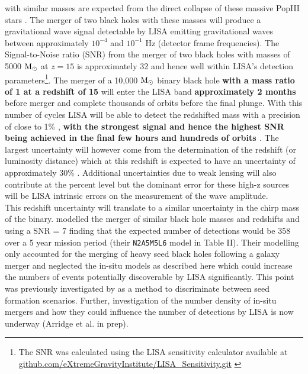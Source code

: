 \documentclass[twocolumn,iop,revtex4]{openjournal}
\newcommand{\msolar} {$\rm{M_{\odot}}~$}
\begin{document}
with similar masses are expected from the direct collapse of these massive PopIII
stars \citep{Heger_2003}. The merger of two black holes with these masses will produce a
gravitational wave signal detectable by LISA \citep{eLISA, Sesana_2016, Cornish_2020} emitting
gravitational waves between approximately $10^{-4}$ and $10^{-1}$ Hz (detector frame frequencies). The
Signal-to-Noise ratio (SNR) from the merger of two black holes with masses of 5000 \msolar at $z = 15$
is approximately 32 and hence well within LISA's detection parameters\footnote{The SNR was calculated
  using the LISA sensitivity calculator available at
  \url{github.com/eXtremeGravityInstitute/LISA_Sensitivity.git} \citep{Robson_2019}}.
The merger of a 10,000 \msolar binary black hole \textbf{with a mass ratio of 1 at a redshift of 15} will enter the LISA band \textbf{approximately 2 months} before merger and complete
thousands of orbits before the final plunge. With this number of cycles LISA will be able to detect
the redshifted mass with a precision of close to 1\% \citep{Sesana_2013}, \textbf{with the strongest signal and hence the highest SNR being achieved in the final few hours and hundreds of orbits \citep{Robson_2019}}. The largest uncertainty
will however come from the determination of the redshift (or luminosity distance) which at this
redshift is expected to have an uncertainty of approximately 30\% \citep{Sesana_2013}. Additional
uncertainties due to weak lensing will also contribute at the percent level
\citep{Shapiro_2010, Petiteau_2011}
but the dominant error for these high-z sources will be LISA intrinsic errors on the measurement of
the wave amplitude. \\
\indent This redshift uncertainty will translate to a similar uncertainty in the chirp mass of the binary.
\cite{Klein_2016} modelled the merger of similar black hole masses and redshifts and using a
SNR = 7 finding that the expected number of detections would be 358 over a 5 year mission period
(their \texttt{N2A5M5L6} model in Table II). Their modelling only accounted for the merging of
heavy seed black holes following a galaxy merger and
neglected the in-situ models as described here which could increase the numbers of events potentially
discoverable by LISA significantly. This point was previously investigated by
\cite{Hartwig_2018} as a method to discriminate between seed formation scenarios. Further,
investigation of the number density of in-situ mergers and how they could influence the number
of detections by LISA is now underway (Arridge et al. in prep).
\end{document}
